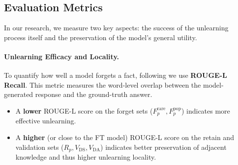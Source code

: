 


 \subsection{Evaluation Metrics}
\label{sec:evaluation}

In our research, we measure two key aspects: the success of the unlearning process itself and the preservation of the model's general utility.

\paragraph{Unlearning Efficacy and Locality.}
To quantify how well a model forgets a fact, following \cite{lin2004rouge, geng2025comprehensive} we use \textbf{ROUGE-L Recall}. This metric measures the word-level overlap between the model-generated response and the ground-truth answer.
\begin{itemize}
    \item A \textbf{lower} ROUGE-L score on the forget sets ($F_p^{\text{rare}}, F_p^{\text{pop}}$) indicates more effective unlearning.
    \item A \textbf{higher} (or close to the FT model) ROUGE-L score on the retain and validation sets ($R_p, V_{\text{DS}}, V_{\text{DA}}$) indicates better preservation of adjacent knowledge and thus higher unlearning locality.
\end{itemize}

